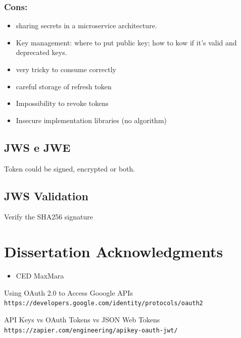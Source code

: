 \documentclass[20pt]{style}
\begin{document}
\subsubsection{Cons:}
\begin{itemize}
    \item sharing secrets in a microservice architecture.
    \item Key management: where to put public key; how to kow if it's valid and
        deprecated keys.
    \item very tricky to consume correctly
    \item careful storage of refresh token
    \item Impossibility to revoke tokens
    \item Insecure implementation libraries (no algorithm)
\end{itemize}

\subsection{JWS e JWE}
Token could be signed, encrypted or both.

\subsection{JWS Validation}
Verify the SHA256 signature

\section{Dissertation Acknowledgments}
\begin{itemize}
    \item CED MaxMara
\end{itemize}

\begin{thebibliography}{9}
    Using OAuth 2.0 to Access Gooogle APIs
    \\
    \texttt{https://developers.google.com/identity/protocols/oauth2}

    API Keys vs OAuth Tokens vs JSON Web Tokens
    \\
    \texttt{https://zapier.com/engineering/apikey-oauth-jwt/}

\end{thebibliography}

\newpage
\end{document}
